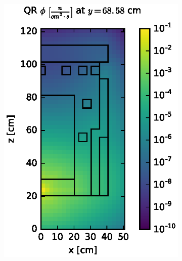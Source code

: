 \documentclass{article} %
\begin{document}
\begin{figure}[!htb]
\centering
\begin{subfigure}{0.4\textwidth}
\includegraphics[max height=0.445\textheight]
{dlvn-fwd-flux-qr04.eps}
\end{subfigure} ~
\begin{subfigure}{0.4\textwidth}

\end{subfigure}
\end{figure}
\end{document}
